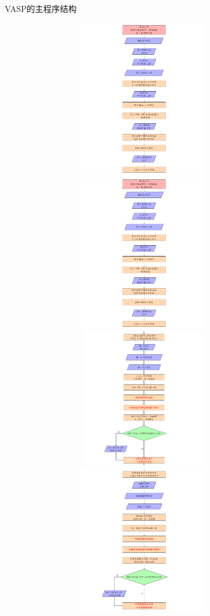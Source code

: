 \begin{frame}[allowframebreaks]{\textrm{VASP}的主程序结构}
\begin{figure}[h!]
\vskip -10pt
\centering
\includegraphics[height=2.65in,width=4.0in,viewport=0 360 562 720,clip]{Figures/VASP_main_Flow-1.png}
\includegraphics[height=2.65in,width=4.0in,viewport=0 0 562 360,clip]{Figures/VASP_main_Flow-1.png}
\includegraphics[height=2.35in,width=4.0in,viewport=0 370 562 680,clip]{Figures/VASP_main_Flow-2.png}
\includegraphics[height=2.50in,width=4.0in,viewport=0 0 562 370,clip]{Figures/VASP_main_Flow-2.png}

\end{figure}
\end{frame}
